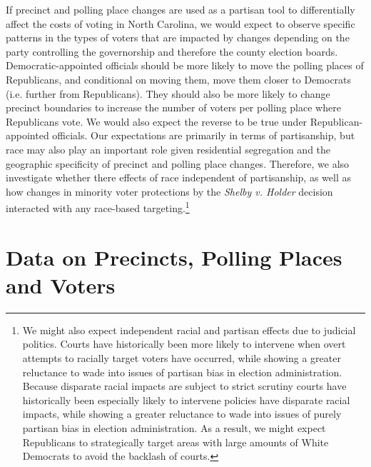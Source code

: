 \documentclass[12pt]{article}
\begin{document}
If precinct and polling place changes are used as a partisan tool to differentially affect the costs of voting in North Carolina, we would expect to observe specific patterns in the types of voters that are impacted by changes depending on the party controlling the governorship and therefore the county election boards.  Democratic-appointed officials should be more likely to move the polling places of Republicans, and conditional on moving them, move them closer to Democrats (i.e. further from Republicans). They should also be more likely to change precinct boundaries to increase the number of voters per polling place where Republicans vote.  We would also expect the reverse to be true under Republican-appointed officials.  Our expectations are primarily in terms of partisanship, but race may also play an important role given residential segregation and the geographic specificity of precinct and polling place changes.  Therefore, we also investigate whether there effects of race independent of partisanship, as well as how changes in minority voter protections by the \emph{Shelby v. Holder} decision interacted with any race-based targeting.\footnote{We might also expect independent racial and partisan effects due to judicial politics. Courts have historically been more likely to intervene when overt attempts to racially target voters have occurred, while showing a greater reluctance to wade into issues of partisan bias in election administration.  Because disparate racial impacts are subject to strict scrutiny courts have historically been especially likely to intervene policies have disparate racial impacts, while showing a greater reluctance to wade into issues of purely partisan bias in election administration.  As a result, we might expect Republicans to strategically target areas with large amounts of White Democrats to avoid the backlash of courts.}



\vspace*{-.2cm}
\section{\large Data on Precincts, Polling Places and Voters}\label{section_data}
\vspace*{-0.5cm}
\end{document}
